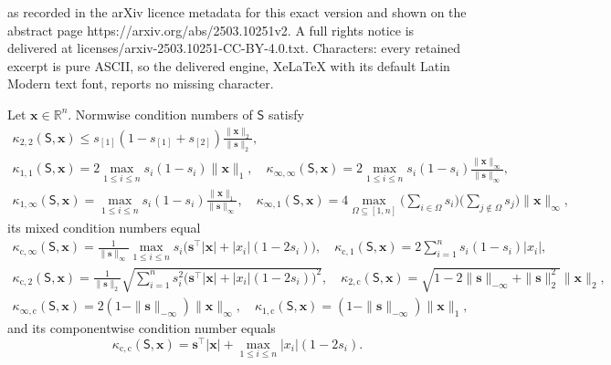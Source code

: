 \documentclass[10pt,a4paper]{amsart}
\newcommand{\Layer}[1]{\mathsf{#1}}
\newcommand{\Matrix}[1]{\mathbf{#1}}
\newcommand{\Norm}[3][]{#1\| #2 #1\|_{\mathrm{#3}}}
\newcommand{\Real}{\mathbb{R}}
\newcommand{\cond}[3][]{\kappa_{\mathrm{#2}} #1( #3 #1)}
\newcommand{\trans}{\intercal}
\begin{document}
as recorded in the arXiv licence metadata for this exact version and shown on the abstract page https://arxiv.org/abs/2503.10251v2. A full rights notice is delivered at licenses/arxiv-2503.10251-CC-BY-4.0.txt. Characters: every retained excerpt is pure ASCII, so the delivered engine, XeLaTeX with its default Latin Modern text font, reports no missing character.
\begin{theorem}
\label{theorem:cond-softmax}
Let $\Matrix{x} \in \Real^n$.
Normwise condition numbers of $\Layer{S}$ satisfy
\begin{gather*}
    \cond{2,2}{\Layer{S}, \Matrix{x}} \leq s_{[1]} (1 - s_{[1]} + s_{[2]}) \frac{\Norm{\Matrix{x}}{2}}{\Norm{\Matrix{s}}{2}}, \\
    \cond{1,1}{\Layer{S}, \Matrix{x}} = 2 \max_{1 \leq i \leq n} s_i (1 - s_i) \Norm{\Matrix{x}}{1}, \quad \cond{\infty,\infty}{\Layer{S}, \Matrix{x}} = 2 \max_{1 \leq i \leq n} s_i (1 - s_i) \frac{\Norm{\Matrix{x}}{\infty}}{\Norm{\Matrix{s}}{\infty}}, \\
    \cond{1,\infty}{\Layer{S}, \Matrix{x}} = \max_{1 \leq i \leq n} s_i (1 - s_i) \frac{\Norm{\Matrix{x}}{1}}{\Norm{\Matrix{s}}{\infty}}, \quad \cond{\infty,1}{\Layer{S}, \Matrix{x}} = 4 \max_{\Omega \subseteq [1,n]} \bigg( \sum_{i \in \Omega} s_i \bigg) \bigg( \sum_{j \not\in \Omega} s_j \bigg) \Norm{\Matrix{x}}{\infty},
\end{gather*}
its mixed condition numbers equal
\begin{gather*}
    \cond{c,\infty}{\Layer{S}, \Matrix{x}} = \frac{1}{\Norm{\Matrix{s}}{\infty}} \max_{1 \leq i \leq n} s_i \big( \Matrix{s}^\trans |\Matrix{x}| + |x_i| (1 - 2 s_i) \big), \quad \cond{c,1}{\Layer{S}, \Matrix{x}} = 2 \sum_{i = 1}^n s_i (1 - s_i) |x_i|, \\
    \cond{c,2}{\Layer{S}, \Matrix{x}} = \frac{1}{\Norm{\Matrix{s}}{2}} \sqrt{\sum_{i = 1}^n s_i^2 \big( \Matrix{s}^\trans |\Matrix{x}| + |x_i| (1 - 2 s_i) \big)^2}, \quad \cond{2,c}{\Layer{S}, \Matrix{x}} = \sqrt{1 - 2 \Norm{\Matrix{s}}{-\infty} + \Norm{\Matrix{s}}{2}^2} \Norm{\Matrix{x}}{2}, \\
    \cond{\infty, c}{\Layer{S}, \Matrix{x}} = 2 (1 - \Norm{\Matrix{s}}{-\infty}) \Norm{\Matrix{x}}{\infty}, \quad \cond{1, c}{\Layer{S}, \Matrix{x}} = (1 - \Norm{\Matrix{s}}{-\infty}) \Norm{\Matrix{x}}{1},
\end{gather*}
and its componentwise condition number equals
\begin{equation*}
    \cond{c,c}{\Layer{S}, \Matrix{x}} = \Matrix{s}^\trans |\Matrix{x}| + \max_{1 \leq i \leq n} |x_i| (1 - 2 s_i). 
\end{equation*}
\end{theorem}
\end{document}
